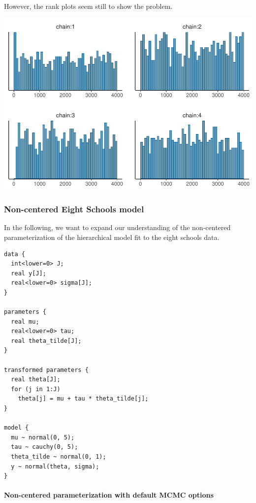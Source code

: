 \documentclass[american,]{article}
\let\oldparagraph\paragraph
\renewcommand{\paragraph}[1]{\oldparagraph{#1}\mbox{}}
\begin{document}
However, the rank plots seem still to show the problem.

\includegraphics{graphics/hist-fit-cp4-tau-1.pdf}

\hypertarget{non-centered-eight-schools-model-1}{%
\subsubsection*{Non-centered Eight Schools
model}\label{non-centered-eight-schools-model-1}}

In the following, we want to expand our understanding of the
non-centered parameterization of the hierarchical model fit to the eight
schools data.

\begin{verbatim}
data {
  int<lower=0> J;
  real y[J];
  real<lower=0> sigma[J];
}

parameters {
  real mu;
  real<lower=0> tau;
  real theta_tilde[J];
}

transformed parameters {
  real theta[J];
  for (j in 1:J)
    theta[j] = mu + tau * theta_tilde[j];
}

model {
  mu ~ normal(0, 5);
  tau ~ cauchy(0, 5);
  theta_tilde ~ normal(0, 1);
  y ~ normal(theta, sigma);
}
\end{verbatim}

\hypertarget{non-centered-parameterization-with-default-mcmc-options}{%
\paragraph{Non-centered parameterization with default MCMC
options}\label{non-centered-parameterization-with-default-mcmc-options}}
\end{document}
